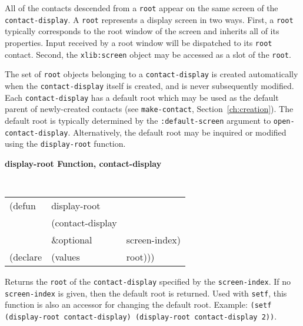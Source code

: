 All of the contacts descended from a {\tt root} appear on the same screen of
the {\tt contact-display}. A {\tt root} represents a display screen in
two ways. First, a {\tt root} typically corresponds to the root window of the
screen and inherits all of its properties\footnotemark{}.  
Input received by a root window
will be dispatched to its {\tt root} contact. Second, the  {\tt xlib:screen} object
may be accessed as a slot of the {\tt root}.

The set of {\tt root} objects belonging to a {\tt contact-display} is
created
automatically when the {\tt contact-display} itself is created, and is never
subsequently modified. Each {\tt contact-display} has a default root which may
be used as the default parent of newly-created contacts (see
{\tt make-contact}, Section~\ref{ch:creation}).
The default
root is typically determined by the {\tt :default-screen} argument to
{\tt open-contact-display}.
Alternatively, the default root may be inquired or modified using the
{\tt display-root} function.

{\samepage
{\large {\bf display-root \hfill Function, contact-display}}
\begin{flushright} \parbox[t]{6.125in}{
\tt
\begin{tabular}{lll}
\raggedright
(defun & display-root & \\ 
& (contact-display\\
& \&optional &  screen-index) \\
(declare &(values  & root)))
\end{tabular}
\rm

}\end{flushright}
}

\begin{flushright} \parbox[t]{6.125in}{
Returns the  {\tt root} of the {\tt contact-display} specified by the
{\tt screen-index}.  If no {\tt screen-index} is given, then the default
root is returned. Used
with {\tt setf}, this function is also an accessor for
changing the default root. Example: {\tt (setf (display-root  
contact-display) (display-root contact-display 2))}.

}\end{flushright}

